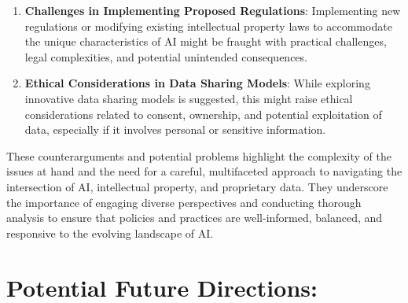 \documentclass{article}[10pt]
\begin{document}
\begin{enumerate}
    \item \textbf{Challenges in Implementing Proposed Regulations}: Implementing new regulations or modifying existing intellectual property laws to accommodate the unique characteristics of AI might be fraught with practical challenges, legal complexities, and potential unintended consequences.
    \item \textbf{Ethical Considerations in Data Sharing Models}: While exploring innovative data sharing models is suggested, this might raise ethical considerations related to consent, ownership, and potential exploitation of data, especially if it involves personal or sensitive information.
\end{enumerate}

These counterarguments and potential problems highlight the complexity of the issues at hand and the need for a careful, multifaceted approach to navigating the intersection of AI, intellectual property, and proprietary data. They underscore the importance of engaging diverse perspectives and conducting thorough analysis to ensure that policies and practices are well-informed, balanced, and responsive to the evolving landscape of AI.

\section{Potential Future Directions:}
\end{document}

